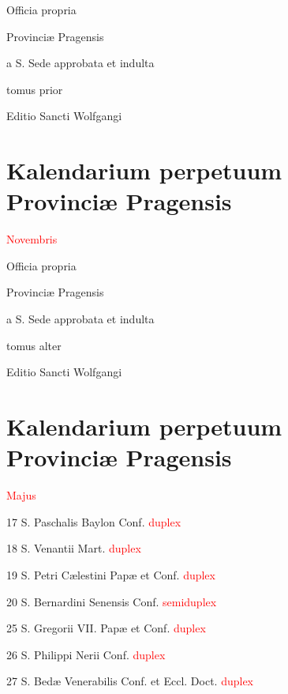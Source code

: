 \documentclass[a4paper, twoside, 10pt]{article}
\newcommand{\rubricatum}[1]{\textcolor{red}{#1}}
\newenvironment{kalendarium}{\setlength{\parindent}{0cm}}{}
\newcommand{\kMensis}[1]{
  \vspace{2mm}
  \hfill {\large\rubricatum{#1}} \hfill
  \vspace{1mm}}
\newcommand{\kDies}[3]{#1 \hspace{2mm} #2 \rubricatum{#3}

}
\newcommand{\titulusTomus}[1]{
  \begin{center}
    {\Huge
      Officia propria

      Provinciæ Pragensis}

    {\Large
      a S. Sede approbata et indulta}

    \vfill

    #1

    \vfill

    Editio Sancti Wolfgangi
  \end{center}
}
\begin{document}
\pagestyle{empty}

\titulusTomus{tomus prior}

\cleardoublepage

\pagestyle{plain}

\section*{Kalendarium perpetuum\\Provinciæ Pragensis}

\begin{kalendarium}
\kMensis{Novembris}

\end{kalendarium}

\cleardoublepage

\begin{multicols}{2}

  

\end{multicols}

\cleardoublepage

\pagestyle{empty}

\titulusTomus{tomus alter}

\cleardoublepage

\pagestyle{plain}

\section*{Kalendarium perpetuum\\Provinciæ Pragensis}

\begin{kalendarium}

\kMensis{Majus}

\kDies{17}{S. Paschalis Baylon Conf.}{duplex}
\kDies{18}{S. Venantii Mart.}{duplex}
\kDies{19}{S. Petri Cælestini Papæ et Conf.}{duplex}
\kDies{20}{S. Bernardini Senensis Conf.}{semiduplex}
\kDies{25}{S. Gregorii VII. Papæ et Conf.}{duplex}
\kDies{26}{S. Philippi Nerii Conf.}{duplex}
\kDies{27}{S. Bedæ Venerabilis Conf. et Eccl. Doct.}{duplex}

\end{kalendarium}
\end{document}
